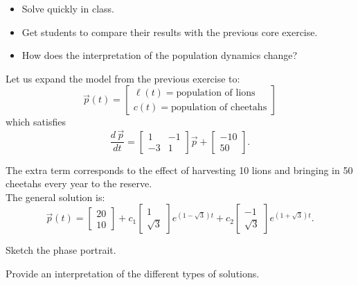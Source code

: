 \begin{annotation}
	\begin{goals}
		\begin{itemize}
			\item Solve quickly in class.
			\item Get students to compare their results with the previous core exercise.
			\item How does the interpretation of the population dynamics change?
		\end{itemize}
	\end{goals}
\end{annotation}
\question \label{sys:phaseportrait-real-equil}
	Let us expand the model from the previous exercise to:
	$$ \vec{p}(t) = \begin{bmatrix} \ell(t) = \text{population of lions} \\ c(t) = \text{population of cheetahs} \end{bmatrix} $$
	which satisfies
	$$
	\frac{d\,\vec{p}}{dt} = \begin{bmatrix}
 		1 & -1 \\
 		-3 & 1
 	\end{bmatrix} \vec{p}
 	+ \begin{bmatrix}
 		- 10 \\ 50
	 \end{bmatrix}.
	$$
	
	The extra term corresponds to the effect of harvesting 10 lions and bringing in 50 cheetahs every year to the reserve. \\
	
	The general solution is:
	$$
	\vec{p}(t) = \begin{bmatrix} 20 \\ 10 \end{bmatrix} +
		c_1 \begin{bmatrix} 1 \\ \sqrt{3} \end{bmatrix} e^{(1-\sqrt{3})t} + c_2 \begin{bmatrix} -1 \\ \sqrt{3} \end{bmatrix} e^{(1+\sqrt{3})t}.
	$$
\begin{parts}
	\item Sketch the phase portrait.
	\item Provide an interpretation of the different types of solutions.
\end{parts}




